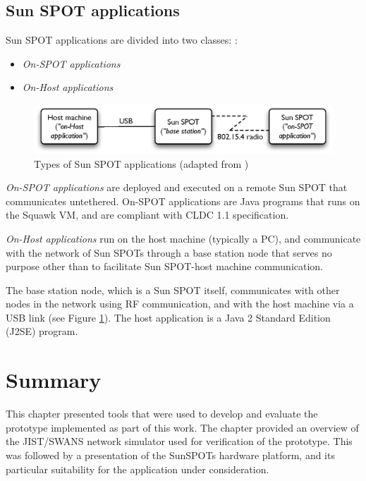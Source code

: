 \subsection{Sun SPOT applications} \label{subsec:sunspotapps}

Sun SPOT applications are divided into two classes:
\cite{sun_developer:2008}:

\begin{itemize}
  \item \emph{On-SPOT applications}
  \item \emph{On-Host applications}
\end{itemize}

\begin{figure}[h]
\centering
\includegraphics[width=\textwidth]{img/SunSPOTS_applications.eps} 
\caption[Types of Sun SPOT applications]{Types of Sun SPOT applications (adapted from
\cite{sun_developer:2008})}
\label{Fig:SunSPOTS_applications}
\end{figure}  

\emph{On-SPOT applications}  are deployed and
executed on a remote Sun SPOT that communicates untethered. On-SPOT
applications are Java programs that runs on the Squawk VM, and are compliant
with CLDC 1.1 specification. 

\emph{On-Host applications} run on the host machine
(typically a PC), and communicate with the network of Sun SPOTs through a base
station node that serves no purpose other than to facilitate Sun SPOT-host
machine communication. 
  
The base station node, which is a Sun SPOT itself, communicates with other
nodes in the network using RF communication, and with the host machine via a
USB link (see Figure \ref{Fig:SunSPOTS_applications}). The host application is
a Java 2 Standard Edition (J2SE) program.
  
 
\section{Summary}

This chapter presented tools that were used to develop and evaluate
the prototype implemented as part of this work. The chapter provided an overview of the JIST/SWANS
network simulator used for verification of the prototype. This was followed by
a presentation of the SunSPOTs hardware platform, and its particular suitability for the application under
consideration.
